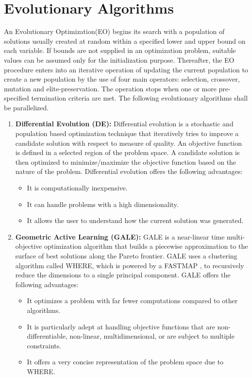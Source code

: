 \documentclass[10pt]{article}
\begin{document}
\section{Evolutionary Algorithms}
\label{algos}

An Evolutionary Optimization(EO) begins its search with a population of solutions usually created at random within a specified lower and upper bound on each variable. If bounds are not supplied in an optimization problem, suitable values can be assumed only for the initialization purpose. Thereafter, the EO procedure enters into an iterative operation of updating the current population to create a new population by the use of four main operators: selection, crossover, mutation and elite-preservation. The operation stops when one or more pre-specified termination criteria are met. The following evolutionary algorithms shall be parallelized.
\begin{enumerate}
\item \textbf{Differential Evolution (DE):} Differential evolution is a stochastic and population based optimization technique that iteratively tries to improve a candidate solution with respect to measure of quality. An objective function is defined in a selected region of the problem space. A candidate solution is then optimized to minimize/maximize the objective function based on the nature of the problem. Differential evolution offers the following advantages:

\begin{itemize}
\item It is computationally inexpensive.
\item It can handle problems with a high dimensionality. 
\item It allows the user to understand how the current solution was generated.
\end{itemize}

\item \textbf{Geometric Active Learning (GALE):} GALE is a near-linear time multi-objective optimization algorithm that builds a piecewise approximation to the surface of best solutions along the Pareto frontier. GALE uses a clustering algorithm called WHERE, which is powered by a FASTMAP \cite{faloutsos95}, to recursively reduce the dimensions to a single principal component. GALE offers the following advantages:

\begin{itemize}
\item It optimizes a problem with far fewer computations compared to other algorithms.
\item It is particularly adept at handling objective functions that are non-differentiable, non-linear, multidimensional, or are subject to multiple constraints.
\item It offers a very concise representation of the problem space due to WHERE.
\end{itemize}
\end{enumerate}
\end{document}

